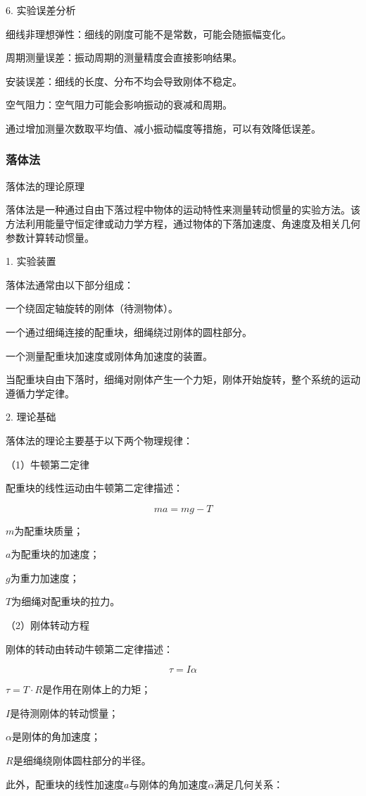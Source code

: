 \documentclass[12pt,hyperref,a4paper,UTF8]{ctexart}
\begin{document}
6. 实验误差分析

细线非理想弹性：细线的刚度可能不是常数，可能会随振幅变化。

周期测量误差：振动周期的测量精度会直接影响结果。

安装误差：细线的长度、分布不均会导致刚体不稳定。

空气阻力：空气阻力可能会影响振动的衰减和周期。


通过增加测量次数取平均值、减小振动幅度等措施，可以有效降低误差。

\subsubsection{落体法}

落体法的理论原理

落体法是一种通过自由下落过程中物体的运动特性来测量转动惯量的实验方法。该方法利用能量守恒定律或动力学方程，通过物体的下落加速度、角速度及相关几何参数计算转动惯量。

1. 实验装置

落体法通常由以下部分组成：

一个绕固定轴旋转的刚体（待测物体）。

一个通过细绳连接的配重块，细绳绕过刚体的圆柱部分。

一个测量配重块加速度或刚体角加速度的装置。


当配重块自由下落时，细绳对刚体产生一个力矩，刚体开始旋转，整个系统的运动遵循力学定律。

2. 理论基础

落体法的理论主要基于以下两个物理规律：

（1）牛顿第二定律

配重块的线性运动由牛顿第二定律描述：

$$ ma = mg - T $$

 $m$为配重块质量；

 $a$为配重块的加速度；

 $g$为重力加速度；

 $T$为细绳对配重块的拉力。


（2）刚体转动方程

刚体的转动由转动牛顿第二定律描述：

$$  \tau = I \alpha $$

 $\tau=T\cdot R$是作用在刚体上的力矩；

 $I$是待测刚体的转动惯量；

 $\alpha$是刚体的角加速度；

 $R$是细绳绕刚体圆柱部分的半径。


此外，配重块的线性加速度$a$与刚体的角加速度$\alpha$满足几何关系：
\end{document}
